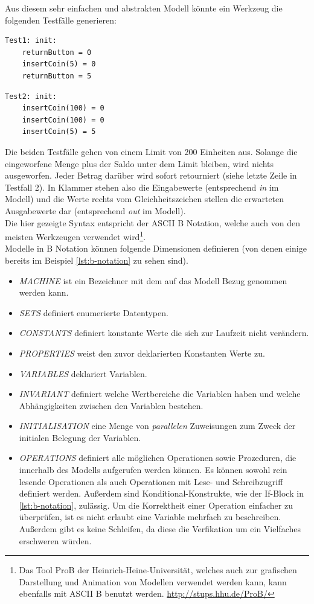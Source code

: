 Aus diesem sehr einfachen und abstrakten Modell könnte ein Werkzeug die folgenden Testfälle generieren:\\

\begin{verbatim}
Test1: init:
	returnButton = 0
	insertCoin(5) = 0
	returnButton = 5
\end{verbatim}

\begin{verbatim}
Test2: init:
	insertCoin(100) = 0
	insertCoin(100) = 0
	insertCoin(5) = 5
\end{verbatim}

Die beiden Testfälle gehen von einem Limit von 200 Einheiten aus. Solange die eingeworfene Menge plus der Saldo unter dem Limit bleiben, wird nichts ausgeworfen. Jeder Betrag darüber wird sofort retourniert (siehe letzte Zeile in Testfall 2). In Klammer stehen also die Eingabewerte (entsprechend \textit{in} im Modell) und die Werte rechts vom Gleichheitszeichen stellen die erwarteten Ausgabewerte dar (entsprechend \textit{out} im Modell).\\
Die hier gezeigte Syntax entspricht der ASCII B Notation, welche auch von den meisten Werkzeugen verwendet wird\footnote{Das Tool ProB der Heinrich-Heine-Universität, welches auch zur grafischen Darstellung und Animation von Modellen verwendet werden kann, kann ebenfalls mit ASCII B benutzt werden. \url{http://stups.hhu.de/ProB/}}.\\

Modelle in B Notation können folgende Dimensionen definieren (von denen einige bereits im Beispiel \ref{lst:b-notation} zu sehen sind).

\begin{itemize}
\item \textit{MACHINE} ist ein Bezeichner mit dem auf das Modell Bezug genommen werden kann.
\item \textit{SETS} definiert enumerierte Datentypen.
\item \textit{CONSTANTS} definiert konstante Werte die sich zur Laufzeit nicht verändern.
\item \textit{PROPERTIES} weist den zuvor deklarierten Konstanten Werte zu.
\item \textit{VARIABLES} deklariert Variablen.
\item \textit{INVARIANT} definiert welche Wertbereiche die Variablen haben und welche Abhängigkeiten zwischen den Variablen bestehen.
\item \textit{INITIALISATION} eine Menge von \textit{parallelen} Zuweisungen zum Zweck der initialen Belegung der Variablen.
\item \textit{OPERATIONS} definiert alle möglichen Operationen sowie Prozeduren, die innerhalb des Modells aufgerufen werden können. Es können sowohl rein lesende Operationen als auch Operationen mit Lese- und Schreibzugriff definiert werden. Außerdem sind Konditional-Konstrukte, wie der If-Block in \ref{lst:b-notation}, zulässig. Um die Korrektheit einer Operation einfacher zu überprüfen, ist es nicht erlaubt eine Variable mehrfach zu beschreiben. Außerdem gibt es keine Schleifen, da diese die Verfikation um ein Vielfaches erschweren würden.
\end{itemize}

